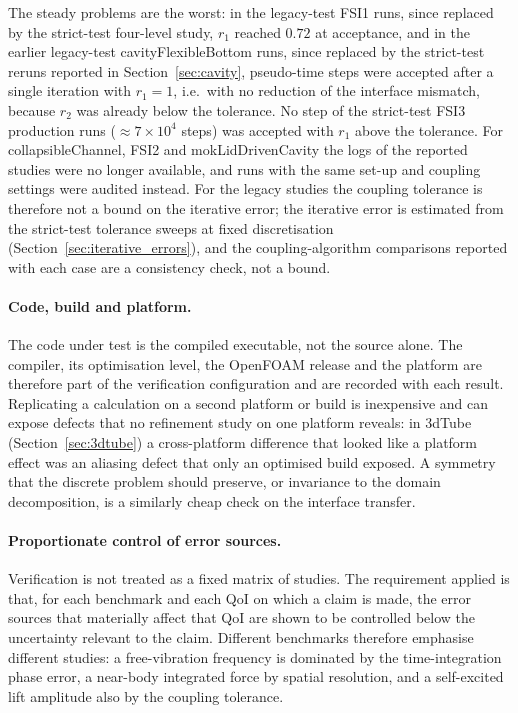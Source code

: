 The steady problems are the worst: in the legacy-test FSI1 runs, since replaced by the strict-test four-level study, $r_1$ reached $0.72$ at acceptance, and in the earlier legacy-test cavityFlexibleBottom runs, since replaced by the strict-test reruns reported in Section~\ref{sec:cavity}, pseudo-time steps were accepted after a single iteration with $r_1=1$, i.e.\ with no reduction of the interface mismatch, because $r_2$ was already below the tolerance.
No step of the strict-test FSI3 production runs ($\approx7\times10^{4}$ steps) was accepted with $r_1$ above the tolerance.
For collapsibleChannel, FSI2 and mokLidDrivenCavity the logs of the reported studies were no longer available, and runs with the same set-up and coupling settings were audited instead.
For the legacy studies the coupling tolerance is therefore not a bound on the iterative error; the iterative error is estimated from the strict-test tolerance sweeps at fixed discretisation (Section~\ref{sec:iterative_errors}), and the coupling-algorithm comparisons reported with each case are a consistency check, not a bound.

\paragraph{Code, build and platform.}
The code under test is the compiled executable, not the source alone.
The compiler, its optimisation level, the OpenFOAM release and the platform are therefore part of the verification configuration and are recorded with each result.
Replicating a calculation on a second platform or build is inexpensive and can expose defects that no refinement study on one platform reveals: in 3dTube (Section~\ref{sec:3dtube}) a cross-platform difference that looked like a platform effect was an aliasing defect that only an optimised build exposed.
A symmetry that the discrete problem should preserve, or invariance to the domain decomposition, is a similarly cheap check on the interface transfer.

\paragraph{Proportionate control of error sources.}
Verification is not treated as a fixed matrix of studies.
The requirement applied is that, for each benchmark and each QoI on which a claim is made, the error sources that materially affect that QoI are shown to be controlled below the uncertainty relevant to the claim.
Different benchmarks therefore emphasise different studies: a free-vibration frequency is dominated by the time-integration phase error, a near-body integrated force by spatial resolution, and a self-excited lift amplitude also by the coupling tolerance.

